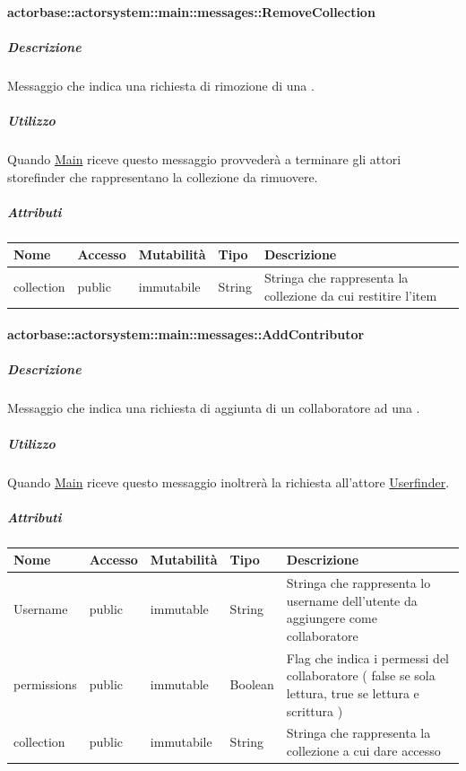 \documentclass{scalatekids-article}
\begin{document}
\paragraph{actorbase::actorsystem::main::messages::RemoveCollection}
\label{sec:actorbase::actorsystem::main::messages::RemoveCollection}

\subparagraph{Descrizione}
Messaggio che indica una richiesta di rimozione di una .

\subparagraph{Utilizzo}
Quando \hyperref[sec:actorbase::actorsystem::main::Main]{Main}
riceve questo messaggio provvederà a terminare gli attori storefinder
che rappresentano la collezione da rimuovere.

\subparagraph{Attributi}
\begin{tabular}{| p{3cm} | p{1.5cm} | p{2cm} | p{2cm} | p{8.5cm} |}
  \hline
  Nome & Accesso & Mutabilità & Tipo & Descrizione\\
  \hline
  collection & public & immutabile & String & Stringa che rappresenta la collezione da cui restitire l'item\\
  \hline
\end{tabular}

\paragraph{actorbase::actorsystem::main::messages::AddContributor}
\label{sec:actorbase::actorsystem::main::messages::AddContributor}

\subparagraph{Descrizione}

Messaggio che indica una richiesta di aggiunta di un collaboratore ad una
.

\subparagraph{Utilizzo}

Quando \hyperref[sec:actorbase::actorsystem::main::Main]{Main}
riceve questo messaggio inoltrerà la richiesta all'attore
\hyperref[sec:actorbase::actorsystem::userfinder::Userfinder]{Userfinder}.

\subparagraph{Attributi}
\begin{tabular}{| p{3cm} | p{1.5cm} | p{2cm} | p{2cm} | p{8.5cm} |}
  \hline
  Nome & Accesso & Mutabilità & Tipo & Descrizione\\
  \hline
  Username & public & immutable & String & Stringa che rappresenta lo username dell'utente da aggiungere come collaboratore\\
  \hline
  permissions & public & immutable & Boolean & Flag che indica i permessi del collaboratore ( false se sola lettura, true se lettura e scrittura )\\
  \hline
  collection & public & immutabile & String & Stringa che rappresenta la collezione a cui dare accesso\\
  \hline
\end{tabular}
\end{document}
